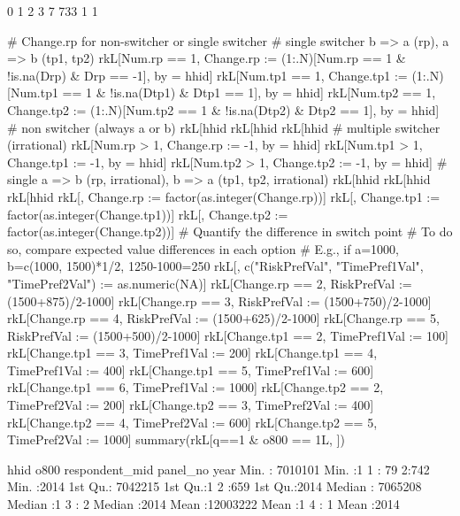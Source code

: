 \begin{Schunk}
\begin{Soutput}
  0   1   2   3 
  7 733   1   1 
\end{Soutput}
\begin{Sinput}
# Change.rp for non-switcher or single switcher
  # single switcher b => a (rp), a => b (tp1, tp2)
rkL[Num.rp == 1, Change.rp := (1:.N)[Num.rp == 1 & !is.na(Drp) & Drp == -1], by = hhid]
rkL[Num.tp1 == 1, Change.tp1 := (1:.N)[Num.tp1 == 1 & !is.na(Dtp1) & Dtp1 == 1], by = hhid]
rkL[Num.tp2 == 1, Change.tp2 := (1:.N)[Num.tp2 == 1 & !is.na(Dtp2) & Dtp2 == 1], by = hhid]
  # non switcher (always a or b)
rkL[hhid %in% hhid[Num.rp == 0], Change.rp := rp]
rkL[hhid %in% hhid[Num.tp1 == 0], Change.tp1 := tp1]
rkL[hhid %in% hhid[Num.tp2 == 0], Change.tp2 := tp2]
  # multiple switcher (irrational)
rkL[Num.rp > 1, Change.rp := -1, by = hhid]
rkL[Num.tp1 > 1, Change.tp1 := -1, by = hhid]
rkL[Num.tp2 > 1, Change.tp2 := -1, by = hhid]
  # single a => b (rp, irrational), b => a (tp1, tp2, irrational)
rkL[hhid %in% hhid[Num.rp == 1 & !is.na(Drp) & Drp == 1], Change.rp := -2]
rkL[hhid %in% hhid[Num.tp1 == 1 & !is.na(Dtp1) & Dtp1 == -1], Change.tp1 := -2]
rkL[hhid %in% hhid[Num.tp2 == 1 & !is.na(Dtp2) & Dtp2 == -1], Change.tp2 := -2]
rkL[, Change.rp := factor(as.integer(Change.rp))]
rkL[, Change.tp1 := factor(as.integer(Change.tp1))]
rkL[, Change.tp2 := factor(as.integer(Change.tp2))]
# Quantify the difference in switch point 
# To do so, compare expected value differences in each option
# E.g., if a=1000, b=c(1000, 1500)*1/2, 1250-1000=250
rkL[, c("RiskPrefVal", "TimePref1Val", "TimePref2Val") := as.numeric(NA)]
rkL[Change.rp == 2, RiskPrefVal := (1500+875)/2-1000]
rkL[Change.rp == 3, RiskPrefVal := (1500+750)/2-1000]
rkL[Change.rp == 4, RiskPrefVal := (1500+625)/2-1000]
rkL[Change.rp == 5, RiskPrefVal := (1500+500)/2-1000]
rkL[Change.tp1 == 2, TimePref1Val := 100]
rkL[Change.tp1 == 3, TimePref1Val := 200]
rkL[Change.tp1 == 4, TimePref1Val := 400]
rkL[Change.tp1 == 5, TimePref1Val := 600]
rkL[Change.tp1 == 6, TimePref1Val := 1000]
rkL[Change.tp2 == 2, TimePref2Val := 200]
rkL[Change.tp2 == 3, TimePref2Val := 400]
rkL[Change.tp2 == 4, TimePref2Val := 600]
rkL[Change.tp2 == 5, TimePref2Val := 1000]
summary(rkL[q==1 & o800 == 1L, ])
\end{Sinput}
\begin{Soutput}
      hhid               o800   respondent_mid panel_no      year     
 Min.   : 7010101   Min.   :1   1 : 79         2:742    Min.   :2014  
 1st Qu.: 7042215   1st Qu.:1   2 :659                  1st Qu.:2014  
 Median : 7065208   Median :1   3 :  2                  Median :2014  
 Mean   :12003222   Mean   :1   4 :  1                  Mean   :2014  

\end{Soutput}
\end{Schunk}
